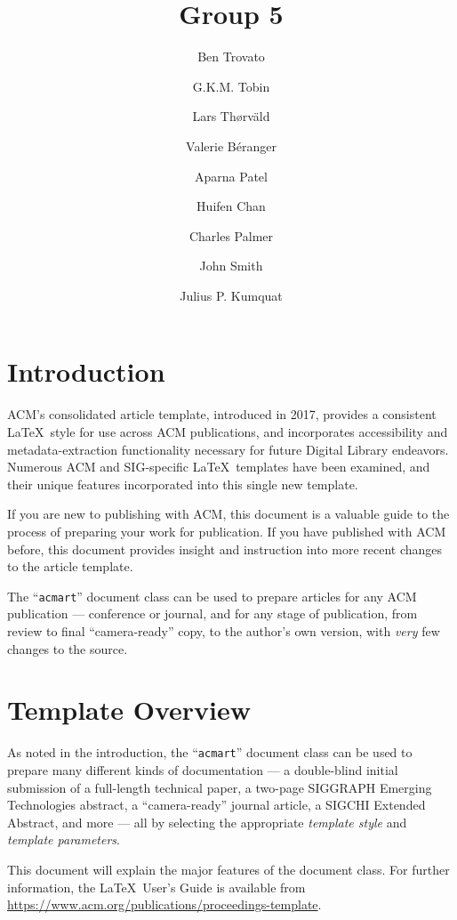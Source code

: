 \documentclass[
  letterpaper,
  DIV=11,
  numbers=noendperiod]{scrartcl}
\title{Group 5}
\author{Ben Trovato \and G.K.M. Tobin \and Lars Thørväld \and Valerie
Béranger \and Aparna Patel \and Huifen Chan \and Charles
Palmer \and John Smith \and Julius P. Kumquat}
\date{}
\begin{document}
\maketitle
\ifdefined\Shaded\renewenvironment{Shaded}{\begin{tcolorbox}[enhanced, sharp corners, boxrule=0pt, borderline west={3pt}{0pt}{shadecolor}, frame hidden, breakable, interior hidden]}{\end{tcolorbox}}\fi

\hypertarget{introduction}{%
\section{Introduction}\label{introduction}}

ACM's consolidated article template, introduced in 2017, provides a
consistent \LaTeX~style for use across ACM publications, and
incorporates accessibility and metadata-extraction functionality
necessary for future Digital Library endeavors. Numerous ACM and
SIG-specific \LaTeX~templates have been examined, and their unique
features incorporated into this single new template.

If you are new to publishing with ACM, this document is a valuable guide
to the process of preparing your work for publication. If you have
published with ACM before, this document provides insight and
instruction into more recent changes to the article template.

The ``\texttt{acmart}'' document class can be used to prepare articles
for any ACM publication --- conference or journal, and for any stage of
publication, from review to final ``camera-ready'' copy, to the author's
own version, with \emph{very} few changes to the source.

\hypertarget{template-overview}{%
\section{Template Overview}\label{template-overview}}

As noted in the introduction, the ``\texttt{acmart}'' document class can
be used to prepare many different kinds of documentation --- a
double-blind initial submission of a full-length technical paper, a
two-page SIGGRAPH Emerging Technologies abstract, a ``camera-ready''
journal article, a SIGCHI Extended Abstract, and more --- all by
selecting the appropriate \emph{template style} and \emph{template
parameters}.

This document will explain the major features of the document class. For
further information, the \LaTeX~User's Guide is available from
\url{https://www.acm.org/publications/proceedings-template}.
\end{document}
